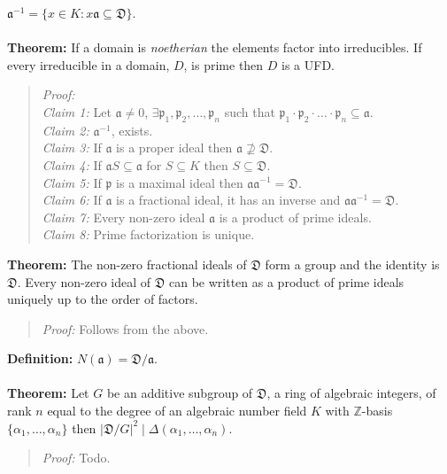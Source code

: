 ${\mathfrak a}^{-1}= \{ x \in K: x {\mathfrak a} \subseteq {\mathfrak D} \}$.
\\
\\
{\bf Theorem:}  If a domain is \emph{noetherian} the elements factor into irreducibles.
If every irreducible in a domain, $D$, is prime then $D$ is a UFD.
\begin{quote}
\emph{Proof:}  
\\
\emph{Claim 1:}
Let ${\mathfrak a} \ne 0$, $\exists
{\mathfrak p}_1 , 
{\mathfrak p}_2 , \ldots ,
{\mathfrak p}_n $ 
such that
$ {\mathfrak p}_1 \cdot {\mathfrak p}_2 \cdot \ldots \cdot{\mathfrak p}_n  \subseteq {\mathfrak a}$.
\\
\emph{Claim 2:}
${\mathfrak a}^{-1}$, exists.
\\
\emph{Claim 3:}
If ${\mathfrak a}$ is a proper ideal then
${\mathfrak a} \nsupseteq {\mathfrak D}$.
\\
\emph{Claim 4:}
If 
${\mathfrak a} S \subseteq {\mathfrak a}$ for
$S \subseteq K$ then
$S \subseteq {\mathfrak D}$.
\\
\emph{Claim 5:}
If ${\mathfrak p}$ is a maximal ideal then
${\mathfrak a} {\mathfrak a}^{-1} = {\mathfrak D}$.
\\
\emph{Claim 6:}
If
${\mathfrak a}$ is a fractional ideal, it has an inverse and
${\mathfrak a} {\mathfrak a}^{-1} = {\mathfrak D}$.
\\
\emph{Claim 7:}
Every non-zero ideal ${\mathfrak a}$ is a product of prime ideals.
\\
\emph{Claim 8:}
Prime factorization is unique.
\end{quote}
{\bf Theorem:}
The non-zero fractional ideals of ${\mathfrak D}$ form a group and the identity is
${\mathfrak D}$.  Every non-zero ideal of ${\mathfrak D}$ can be written as a product of prime
ideals uniquely up to the order of factors.
\begin{quote}
\emph{Proof:}  
Follows from the above.
\end{quote}
{\bf Definition:}
$N({\mathfrak a})= {\mathfrak D}/ {\mathfrak a}$.
\\
\\
{\bf Theorem:}  Let $G$ be an additive subgroup of
${\mathfrak D}$, a ring of algebraic integers, of rank $n$ equal to the degree of an
algebraic number field $K$ with ${\mathbb Z}$-basis $\{ \alpha_1 , \ldots , \alpha_n \}$
then $|{\mathfrak D}/G|^2 \mid \Delta(\alpha_1, \ldots , \alpha_n)$.
\begin{quote}
\emph{Proof:}  
Todo.
\end{quote}
